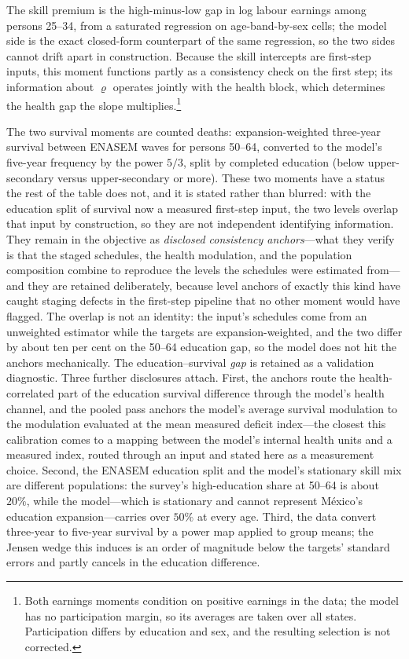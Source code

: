 \documentclass[12pt,a4paper]{article}
\begin{document}
The skill premium is the high-minus-low gap in log labour earnings among persons 25--34, from a saturated regression on age-band-by-sex cells; the model side is the exact closed-form counterpart of the same regression, so the two sides cannot drift apart in construction. Because the skill intercepts are first-step inputs, this moment functions partly as a consistency check on the first step; its information about $\varrho$ operates jointly with the health block, which determines the health gap the slope multiplies.\footnote{Both earnings moments condition on positive earnings in the data; the model has no participation margin, so its averages are taken over all states. Participation differs by education and sex, and the resulting selection is not corrected.}

The two survival moments are counted deaths: expansion-weighted three-year survival between ENASEM waves for persons 50--64, converted to the model's five-year frequency by the power $5/3$, split by completed education (below upper-secondary versus upper-secondary or more).
These two moments have a status the rest of the table does not, and it is stated rather than blurred: with the education split of survival now a measured first-step input, the two levels overlap that input by construction, so they are not independent identifying information. They remain in the objective as \emph{disclosed consistency anchors}---what they verify is that the staged schedules, the health modulation, and the population composition combine to reproduce the levels the schedules were estimated from---and they are retained deliberately, because level anchors of exactly this kind have caught staging defects in the first-step pipeline that no other moment would have flagged. The overlap is not an identity: the input's schedules come from an unweighted estimator while the targets are expansion-weighted, and the two differ by about ten per cent on the 50--64 education gap, so the model does not hit the anchors mechanically. The education--survival \emph{gap} is retained as a validation diagnostic. Three further disclosures attach. First, the anchors route the health-correlated part of the education survival difference through the model's health channel, and the pooled pass anchors the model's average survival modulation to the modulation evaluated at the mean measured deficit index---the closest this calibration comes to a mapping between the model's internal health units and a measured index, routed through an input and stated here as a measurement choice. Second, the ENASEM education split and the model's stationary skill mix are different populations: the survey's high-education share at 50--64 is about $20\%$, while the model---which is stationary and cannot represent M\'exico's education expansion---carries over $50\%$ at every age. Third, the data convert three-year to five-year survival by a power map applied to group means; the Jensen wedge this induces is an order of magnitude below the targets' standard errors and partly cancels in the education difference.
\end{document}
